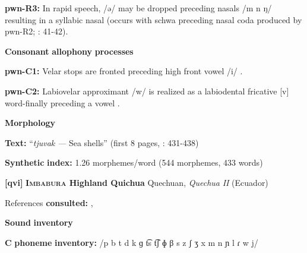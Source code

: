 \begin{styleBody}
\textbf{pwn-R3:} In rapid speech, /ə/ may be dropped preceding nasals /m n ŋ/ resulting in a syllabic nasal (occurs with schwa preceding nasal coda produced by pwn-R2; \citealt{Chang2006}: 41-42).
\end{styleBody}

\begin{styleBody}
\textbf{Consonant} \textbf{allophony} \textbf{processes}
\end{styleBody}

\begin{styleBody}
\textbf{pwn-C1:} Velar stops are fronted preceding high front vowel /i/ \citep[22]{Chang2006}.
\end{styleBody}

\begin{styleBody}
\textbf{pwn-C2:} Labiovelar approximant /w/ is realized as a labiodental fricative [v] word-finally preceding a vowel \citep[40]{Chang2006}.
\end{styleBody}

\begin{styleBody}
\textbf{Morphology}
\end{styleBody}

\begin{styleBody}
\textbf{Text:} “\textit{tjuvak} \textit{—} Sea shells” (first 8 pages, \citealt{Chang2006}: 431-438)
\end{styleBody}

\begin{styleBody}
\textbf{Synthetic} \textbf{index:} 1.26 morphemes/word (544 morphemes, 433 words)
\end{styleBody}

\begin{styleBody}
\textbf{[qvi]}   \textbf{\textsc{Imbabura} \textbf{Highland} \textbf{Quichua}}    Quechuan, \textit{Quechua} \textit{II} (Ecuador)
\end{styleBody}

\begin{styleBody}
References \textbf{consulted:} \citet{Carpenter1982}, \citet{Cole1982}
\end{styleBody}

\begin{styleBody}
\textbf{Sound} \textbf{inventory}
\end{styleBody}

\begin{styleBody}
\textbf{C} \textbf{phoneme} \textbf{inventory:} /p b t d k ɡ t͡s t͡ʃ ɸ β s z ʃ ʒ x m n ɲ l ɾ w j/
\end{styleBody}

